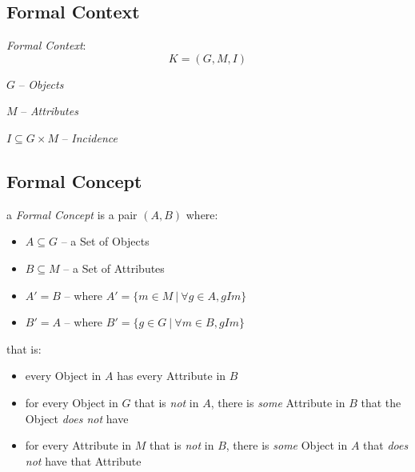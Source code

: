 \subsection{Formal Context}\label{sec:formal_context}

\emph{Formal Context}:
\[
  K = (G,M,I)
\]

$G$ -- \emph{Objects}

$M$ -- \emph{Attributes}

$I \subseteq G \times M$ -- \emph{Incidence}



\subsection{Formal Concept}\label{sec:formal_concept}

a \emph{Formal Concept} is a pair $(A,B)$ where:
\begin{itemize}
  \item $A \subseteq G$ -- a Set of Objects
  \item $B \subseteq M$ -- a Set of Attributes
  \item $A' = B$ -- where $A' = \{ m \in M \ |\ \forall g \in A, gIm \}$
  \item $B' = A$ -- where $B' = \{ g \in G \ |\ \forall m \in B, gIm \}$
\end{itemize}
that is:
\begin{itemize}
  \item every Object in $A$ has every Attribute in $B$
  \item for every Object in $G$ that is \emph{not} in $A$, there is
    \emph{some} Attribute in $B$ that the Object \emph{does not} have
  \item for every Attribute in $M$ that is \emph{not} in $B$, there is
    \emph{some} Object in $A$ that \emph{does not} have that Attribute
\end{itemize}

